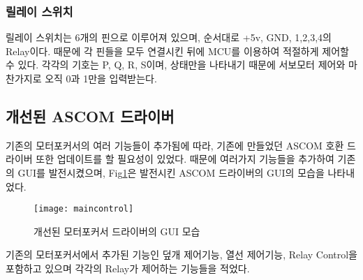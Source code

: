 \subsubsection{릴레이 스위치}

 릴레이 스위치는 6개의 핀으로 이루어져 있으며, 순서대로 +5v, GND, 1,2,3,4의 Relay이다. 때문에 각 핀들을 모두 연결시킨 뒤에 MCU를 이용하여 적절하게 제어할 수 있다. 각각의 기호는 P, Q, R, S이며, 상태만을 나타내기 때문에 서보모터 제어와 마찬가지로 오직 0과 1만을 입력받는다.
 
 
\newpage
\subsection{개선된 ASCOM 드라이버}


 기존의 모터포커서의 여러 기능들이 추가됨에 따라, 기존에 만들었던 ASCOM 호환 드라이버 또한 업데이트를 할 필요성이 있었다. 때문에 여러가지 기능들을 추가하여 기존의 GUI를 발전시켰으며, Fig\ref{maincontrol}은 발전시킨 ASCOM 드라이버의 GUI의 모습을 나타내었다.
 
 \begin{figure}[h]
	\begin{center}
		\texttt{[image: maincontrol]}
	\end{center}
	\caption{개선된 모터포커서 드라이버의 GUI 모습}
	\label{maincontrol}
\end{figure}

 기존의 모터포커서에서 추가된 기능인 덮개 제어기능, 열선 제어기능, Relay Control을 포함하고 있으며 각각의 Relay가 제어하는 기능들을 적었다.
